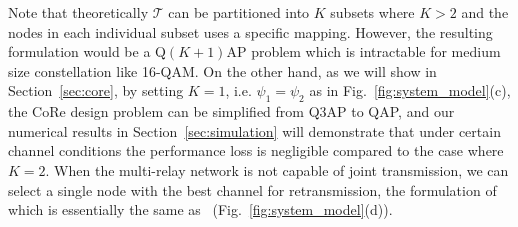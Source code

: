 \documentclass[conference]{IEEEtran}
\begin{document}
Note that theoretically $\mathcal{T}$ can be partitioned into $K$ subsets where
$K>2$ and the nodes in each individual subset uses a specific mapping.
However, the resulting formulation would be a Q$(K+1)$AP problem which is
intractable for medium size constellation like 16-QAM. On the other hand, as we
will show in Section~\ref{sec:core}, by setting $K = 1$, i.e. $\psi_1 =
\psi_2$ as in Fig.~\ref{fig:system_model}(c), the CoRe design problem can be
simplified from Q3AP to QAP, and our numerical results in
Section~\ref{sec:simulation} will demonstrate that under certain channel
conditions the performance loss is negligible compared to the case where $K =
2$. When the multi-relay network is not capable of joint transmission, we can
select a single node with the best channel for retransmission, the formulation
of which is essentially the same as~\cite{ryu2011ber}
(Fig.~\ref{fig:system_model}(d)).
%
%



%
%
\end{document}
